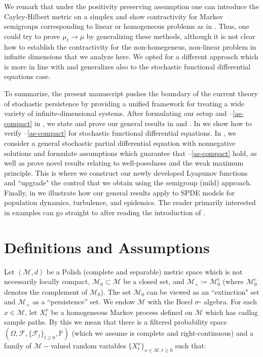 \documentclass[final]{amsart}
\numberwithin{thm}{section}
\numberwithin{equation}{section}
\newcommand{\Prb}{\mathbb{P}}
\newcommand{\mcM}{\mathcal{M}}
\newcommand{\inv}{\mathcal{M}_+}
\begin{document}
 
We remark that under the positivity preserving assumption one can introduce the Cayley-Hilbert metric on a simplex
 and show contractivity for Markov semigroups corresponding to linear or homogeneous problems
 as in \cite{BenaimLobrySari25, Bushell86, cohenfausti2024}. Thus, one could try to prove $\mu_t \to \mu$ by generalizing these methods, although it is not clear how to establish the contractivity for the non-homegeneus, non-linear problem in infinite dimensions that we analyze here. We opted for a different approach which is more in line with \cite{persistence} and generalizes also to the stochastic functional differential equations case. 
 
To summarize, the present manuscript  pushes the boundary of the current theory of stochastic persistence by providing a unified framework for treating a wide variety of infinite-dimensional systems. After formulating our setup and --\ref{as-compact} in , we state and prove our general results in  and . In  we show how to verify --\ref{as-compact} for stochastic functional differential equations. In , we consider a general stochastic partial differential equation with nonnegative solutions and formulate assumptions which guarantee that --\ref{as-compact} hold, as well as prove novel results relating to well-posedness and the weak maximum principle. This is where we construct our newly developed Lyapunov functions and ``upgrade" the control that  we obtain using the semigroup (mild) approach. Finally, in  we illustrate how our general results apply to SPDE models for population dynamics, turbulence, and epidemics.
The reader primarily interested in examples can go straight to  after reading the introduction of .

\section{Definitions and Assumptions}\label{deff-and-as}
Let $(\mcM,d)$ be a Polish (complete and separable) metric space which is not necessarily locally compact, $\mcM_0 \subset \mcM$ be a closed set, and $\inv \coloneqq \mcM_0^c$ (where $\mcM_0^c$ denotes the complement of $\mcM_0$). The set $\mcM_0$ can be viewed as an ``extinction" set and $\inv$ as a ``persistence'' set.
 We endow $\mcM$ with the Borel $\sigma$- algebra. For each $x \in \mcM$, let $X_t^x$ be a homogeneous Markov process defined on $\mcM$ which has cadlag sample paths. By this we mean that there is a filtered probability space $(\Omega, \mathcal{F}, \{\mathcal{F}_t\}_{t \geq 0}, \Prb)$ (which we assume is complete and right-continuous) and a family of $\mcM-$valued random variables $\{X_t^x\}_{x \in \mcM, t \geq 0}$ such that:
\end{document}
